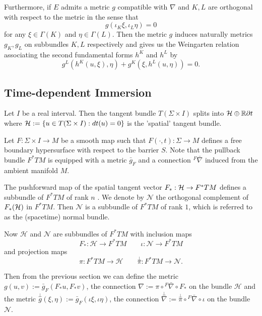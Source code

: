 Furthermore, if $E$ admits a metric $g$ compatible with $\nabla $ and $K,L$ are orthogonal with respect to the metric in the sense that 
\begin{equation}
    g(\iota _K \xi ,\iota _L \eta  )=0
\end{equation}
for any $\xi \in \Gamma (K)$ and $\eta \in \Gamma (L)$. Then the metric $g$ induces naturally metrics $g_K, g_L$ on subbundles $K,L$ respectively and gives us the Weingarten relation associating the second fundamental forms $h^K$ and $h^L$ by 
\begin{equation}
    g^L(h^K(u,\xi ), \eta )+g^K(\xi ,h^L(u,\eta ))=0.
\end{equation}

\subsection{Time-dependent Immersion}
Let $I$ be a real interval. Then the tangent bundle $T(\Sigma \times I)$ splits into $\mathcal{H} \oplus \mathbb{R} \partial t$ where $\mathcal{H} := \left\{ u \in T(\Sigma \times I) : dt(u)=0\right\} $  is the 'spatial' tangent bundle.

Let $F: \Sigma \times I \to M$ be a smooth map such that $F(\cdot,t) : \Sigma \to M $ defines a free boundary hypersurface with respect to the barrier $S$. Note that the pullback bundle $F^*TM$ is equipped with a metric $\bar{g}_F$ and a connection ${}^F \bar{\nabla }$ induced from the ambient manifold $M$. 

The pushforward map of the spatial tangent vector $F_* : \mathcal{H} \to F^*TM $ defines a subbundle of $F^*TM$ of rank $n$ . We denote by $\mathcal{N} $ the orthogonal complement of $F_*(\mathcal{H})$ in $F^*TM$. Then $\mathcal{N} $ is a subbundle of $F^*TM $ of rank $1$, which is referred to as the (spacetime) normal bundle.

Now $\mathcal{H} $ and $\mathcal{N} $ are subbundles of $F^*TM $ with inclusion maps
\[F_*: \mathcal{H} \to F^*TM \qquad \iota : \mathcal{N} \to F^*TM \]
and projection maps
\[\pi : F^*TM \to \mathcal{H} \qquad \overset{\perp }{\pi} : F^*TM \to \mathcal{N} .\]

Then from the previous section we can define the metric $g(u,v):=\bar{g}_F(F_* u, F_* v)$, the connection $\nabla := \pi \circ {}^F \bar{\nabla } \circ F_*$ on the bundle $\mathcal{H} $ and the metric $\overset{\perp }{g} (\xi , \eta ):=\bar{g}_F(\iota \xi , \iota \eta )$, the connection $\overset{\perp }{\nabla} := \overset{\perp }{\pi} \circ {}^F \bar{\nabla } \circ \iota $ on the bundle $\mathcal{N} $.

